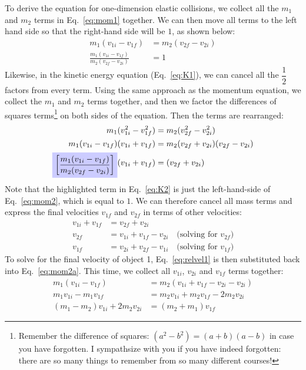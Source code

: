 \documentclass{../../oss-handout}
\begin{document}
To derive the equation for one-dimension elastic collisions, we collect
all the $m_1$ and $m_2$ terms in Eq.~\ref{eq:mom1} together. We can then move
all terms to the left hand side so that the right-hand side will be $1$, as
shown below:
\begin{align}
  m_1(v_{1i}-v_{1f})&=m_2(v_{2f}-v_{2i}) \label{eq:mom2a}\\
  \frac{m_1(v_{1i}-v_{1f})}{m_2(v_{2f}-v_{2i})}&=1 \label{eq:mom2}
\end{align}
Likewise, in the kinetic energy equation (Eq.\ \ref{eq:K1}), we can cancel all
the $\dfrac12$ factors from every term. Using the same approach
as the momentum equation, we collect the $m_1$ and $m_2$ terms together, and
then we factor the differences of squares terms\footnote{Remember the
  difference of squares: $(a^2-b^2)=(a+b)(a-b)$ in case you have forgotten. I
  sympathsize with you if you have indeed forgotten: there are so many things
  to remember from so many different courses!} on both sides of the equation.
Then the  terms are rearranged:
\begin{align}
  \nonumber m_1(v_{1i}^2-v_{1f}^2) &= m_2(v_{2f}^2-v_{2i}^2)\\
  \nonumber m_1(v_{1i}-v_{1f})(v_{1i}+v_{1f}) &= m_2(v_{2f}+v_{2i})(v_{2f}-v_{2i})\\
  \tikz[baseline]{
    \node[fill=blue!20] (n1) {
      $\left[\dfrac{m_1(v_{1i}-v_{1f})}{m_2(v_{2f}-v_{2i})}\right]$
    }
  }(v_{1i}+v_{1f}) &= (v_{2f}+v_{2i})
  \label{eq:K2}
\end{align}
Note that the highlighted term in Eq.~\ref{eq:K2} is just the left-hand-side
of Eq.~\ref{eq:mom2}, which is equal to $1$. We can therefore cancel all mass
terms and express the final velocities $v_{1f}$ and $v_{2f}$ in terms of other
velocities:
\begin{align}
  \nonumber  v_{1i}+v_{1f} &= v_{2f}+v_{2i}\\
  v_{2f}&=v_{1i}+v_{1f}-v_{2i}\quad\text{(solving for $v_{2f}$)}\label{eq:relvel1}\\
  v_{1f}&=v_{2i}+v_{2f}-v_{1i}\quad\text{(solving for $v_{1f}$)}\label{eq:relvel}
\end{align}
To solve for the final velocity of object 1, Eq.~\ref{eq:relvel1} is then
substituted back into Eq.~\ref{eq:mom2a}. This time, we collect all $v_{1i}$,
$v_{2i}$ and $v_{1f}$ terms together:
\begin{align}
  m_1(v_{1i}-v_{1f})&=m_2(v_{1i}+v_{1f}-v_{2i}-v_{2i})\\
  m_1v_{1i}-m_1v_{1f}&=m_2v_{1i}+m_2v_{1f}-2m_2v_{2i}\\
  (m_1-m_2)v_{1i}+2m_2v_{2i}&=(m_2+m_1)v_{1f}
  \label{eq:mom3}
\end{align}
\end{document}
